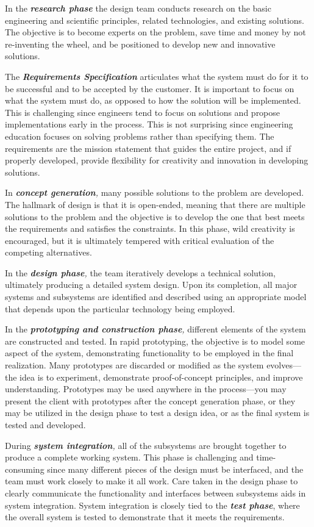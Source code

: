 \documentclass[a4paper,10pt]{book}
\begin{document}
In the \emph{\textbf{research phase}} the design team conducts research
on the basic engineering and scientific principles, related
technologies, and existing solutions. The objective is to become experts
on the problem, save time and money by not re-inventing the wheel, and
be positioned to develop new and innovative solutions.

The \emph{\textbf{Requirements Specification}} articulates what the
system must do for it to be successful and to be accepted by the
customer. It is important to focus on what the system must do, as
opposed to how the solution will be implemented. This is challenging
since engineers tend to focus on solutions and propose implementations
early in the process. This is not surprising since engineering education
focuses on solving problems rather than specifying them. The
requirements are the mission statement that guides the entire project,
and if properly developed, provide flexibility for creativity and
innovation in developing solutions.

In \emph{\textbf{concept generation},} many possible solutions to the
problem are developed. The hallmark of design is that it is open-ended,
meaning that there are multiple solutions to the problem and the
objective is to develop the one that best meets the requirements and
satisfies the constraints. In this phase, wild creativity is encouraged,
but it is ultimately tempered with critical evaluation of the competing
alternatives.

In the \emph{\textbf{design phase},} the team iteratively develops a
technical solution, ultimately producing a detailed system design. Upon
its completion, all major systems and subsystems are identified and
described using an appropriate model that depends upon the particular
technology being employed.

In the \emph{\textbf{prototyping and construction phase},} different
elements of the system are constructed and tested. In rapid prototyping,
the objective is to model some aspect of the system, demonstrating
functionality to be employed in the final realization. Many prototypes
are discarded or modified as the system evolves---the idea is to
experiment, demonstrate proof-of-concept principles, and improve
understanding. Prototypes may be used anywhere in the process---you may
present the client with prototypes after the concept generation phase,
or they may be utilized in the design phase to test a design idea, or as
the final system is tested and developed.

During \emph{\textbf{system integration},} all of the subsystems are
brought together to produce a complete working system. This phase is
challenging and time-consuming since many different pieces of the design
must be interfaced, and the team must work closely to make it all work.
Care taken in the design phase to clearly communicate the functionality
and interfaces between subsystems aids in system integration. System
integration is closely tied to the \emph{\textbf{test phase}}, where the
overall system is tested to demonstrate that it meets the requirements.
\end{document}
